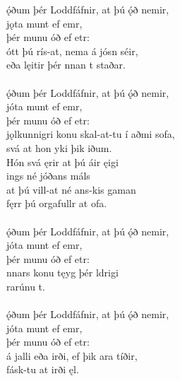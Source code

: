 \bva {}ǫ́ðum þér Loddfáfnir, \hld at þú ǫ́ð nemir, \\%
\ind {}jǫta munt ef emr, \\%
\ind þér munu óð ef etr: \\%
ótt þú rís-at, \hld nema á jósn séir, \\%
\ind eða lęitir þér nnan t staðar.\\%

 \\

\bva {}ǫ́ðum þér Loddfáfnir, \hld at þú ǫ́ð nemir, \\%
\ind {}jóta munt ef emr, \\%
\ind þér munu óð ef etr: \\%
jǫlkunnigri konu \hld skal-at-tu í aðmi sofa, \\%
\ind svá at hon yki þik iðum. \\%
Hón svá ęrir \hld at þú áir ęigi \\%
\ind {}ings né jóðans máls \\%
at þú vill-at \hld né ans-kis gaman \\%
\ind fęrr þú orgafullr at ofa.\\%

 \\

\bva {}ǫ́ðum þér Loddfáfnir, \hld at þú ǫ́ð nemir, \\%
\ind {}jóta munt ef emr, \\%
\ind þér munu óð ef etr: \\%
nnars konu \hld tęyg þér ldrigi \\%
\ind {}rarúnu t.\\%

 \\

\bva {}ǫ́ðum þér Loddfáfnir, \hld at þú ǫ́ð nemir, \\%
\ind {}jóta munt ef emr, \\%
\ind þér munu óð ef etr: \\%
á jalli eða irði, \hld ef þik ara tíðir, \\%
\ind fásk-tu at irði ęl.\\%

